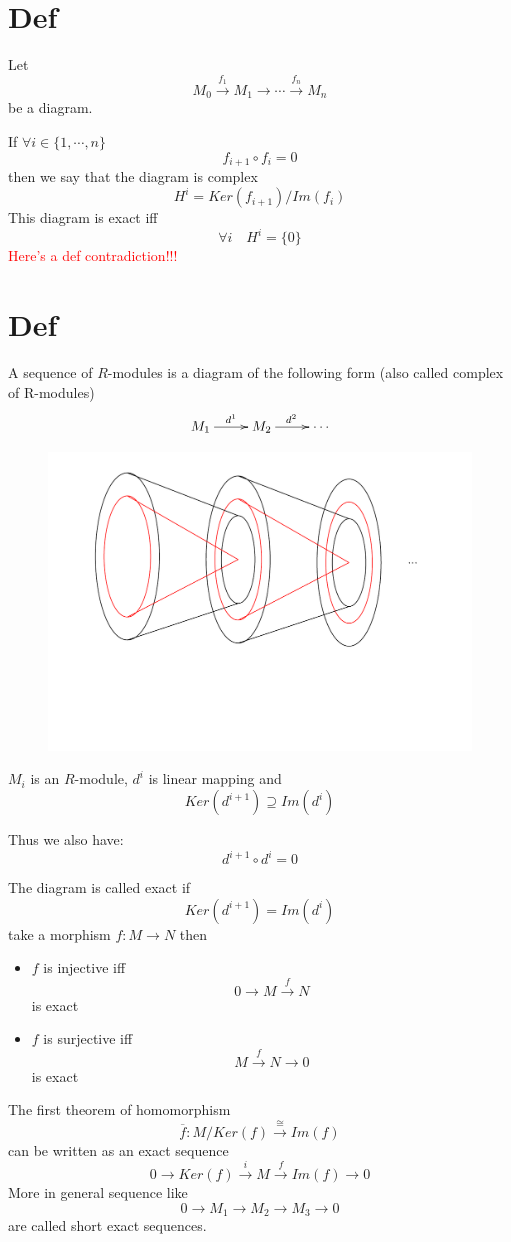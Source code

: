 \documentclass{book}
\begin{document}
\section{Def}
Let $$M_0\stackrel{f_1}{\rightarrow}M_1\rightarrow\cdots\stackrel{f_n}\rightarrow M_n$$
be a diagram.

If $\forall i\in \{1,\cdots,n\}$$$f_{i+1}\circ f_i=0$$
then we say that the diagram is complex
$$H^i=Ker(f_{i+1})/Im(f_i)$$
This diagram is exact iff $$\forall i\quad H^i=\{0\}$$
\textcolor{red}{Here's a def contradiction!!!}
\section{Def}
A sequence of $R$-modules is a diagram of the following form (also called complex of R-modules)
$$\xymatrix{
    M_1\ar[r]^{d^1} & M_2\ar[r]^{d^2} & \cdots
}$$
\begin{figure}[!h]
    \centering
    \includegraphics[scale=0.3]{img/1.pdf}
\end{figure}

$M_i$ is an $R$-module, $d^i$ is linear mapping and $$Ker(d^{i+1})\supseteq Im(d^i)$$ 

Thus we also have: $$d^{i+1}\circ d^i=0$$

The diagram is called exact if $$Ker(d^{i+1})=Im(d^i)$$
take a morphism $f:M\rightarrow N$ then 
\begin{itemize}
    \item $f$ is injective iff $$0\rightarrow M \stackrel{f}{\rightarrow} N$$ is exact
    \item $f$ is surjective iff $$M\stackrel{f}\rightarrow N\rightarrow 0$$ is exact
\end{itemize}
The first theorem of homomorphism 
$$\overline{f}:M/Ker(f)\stackrel{\cong}{\rightarrow}Im(f)$$
can be written as an exact sequence
$$0\rightarrow Ker(f)\stackrel{i}{\rightarrow}M\stackrel{f}{\rightarrow}Im(f)\rightarrow 0$$
More in general sequence like
$$0\rightarrow M_1\rightarrow M_2\rightarrow M_3\rightarrow 0$$
are called short exact sequences.
\end{document}
